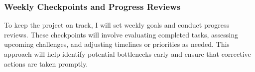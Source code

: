 \subsubsection{Weekly Checkpoints and Progress Reviews}

To keep the project on track, I will set weekly goals and conduct progress reviews. These checkpoints will involve evaluating completed tasks, assessing upcoming challenges, and adjusting timelines or priorities as needed. This approach will help identify potential bottlenecks early and ensure that corrective actions are taken promptly.